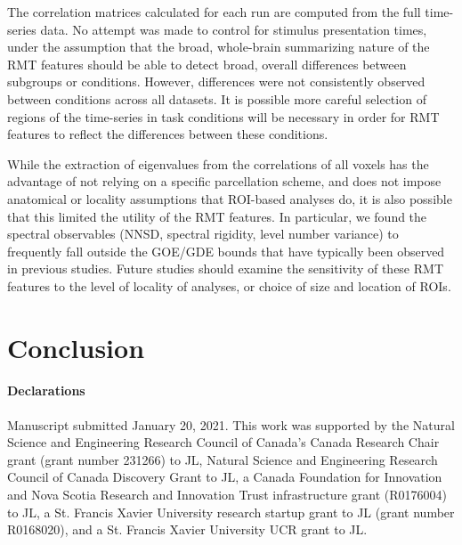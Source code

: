 The correlation matrices calculated for each run are computed from the full time-series data. No
attempt was made to control for stimulus presentation times, under the assumption that the broad,
whole-brain summarizing nature of the RMT features should be able to detect broad, overall
differences between subgroups or conditions. However, differences were not consistently observed
between conditions across all datasets. It is possible more careful selection of regions of the
time-series in task conditions will be necessary in order for RMT features to reflect the
differences between these conditions.

While the extraction of eigenvalues from the correlations of all voxels has the advantage of not
relying on a specific parcellation scheme, and does not impose anatomical or locality assumptions
that ROI-based analyses do, it is also possible that this limited the utility of the RMT features.
In particular, we found the spectral observables (NNSD, spectral rigidity, level number variance) to
frequently fall outside the GOE/GDE bounds that have typically been observed in previous studies.
Future studies should examine the sensitivity of these RMT features to the level of locality of
analyses, or choice of size and location of ROIs.

\section{Conclusion}


\paragraph{Declarations}
Manuscript submitted January 20, 2021. This work was supported by the  Natural Science and
Engineering Research Council of Canada's Canada Research Chair grant (grant number 231266) to JL,
Natural Science and Engineering Research Council of Canada Discovery Grant to JL, a Canada
Foundation for Innovation and Nova Scotia Research and Innovation Trust infrastructure grant
(R0176004) to JL, a St. Francis Xavier University research startup grant to JL (grant number
R0168020), and a St. Francis Xavier University UCR grant to JL.


